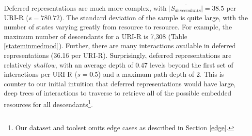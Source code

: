 \documentclass{sig-alternate}
\begin{document}
Deferred representations are much more complex, with $\overline{|S_{descendants}|}=38.5$ per URI-R ($s=780.72$). The standard deviation of the sample is quite large, with the number of states varying greatly from resource to resource. For example, the maximum number of descendants for a URI-R is 7,308 (Table \ref{stateminmedmod}). Further, there are many interactions available in deferred representations (36.16 per URI-R). Surprisingly, deferred representations are relatively \emph{shallow}, with an average depth of 0.47 levels beyond the first set of interactions per URI-R ($s=0.5$) and a maximum path depth of 2. This is counter to our initial intuition that deferred representations would have large, deep trees of interactions to traverse to retrieve all of the possible embedded resources for all descendants\footnote{Our dataset and toolset omits edge cases as described in Section \ref{edge}.}.

\end{document}
